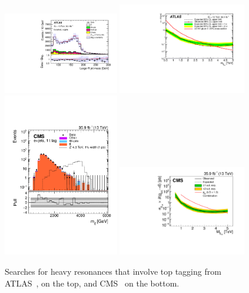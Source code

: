 \begin{figure}[t]
  \includegraphics[width=0.45\textwidth]{figures/ATLAS_top_largeRjetmass.pdf}
  \includegraphics[width=0.5\textwidth]{figures/ATLAS_masslimit_tt_Gkk.pdf} \\
  \includegraphics[width=0.45\textwidth]{figures/CMS_res_ttsemi.pdf}
  \includegraphics[width=0.5\textwidth]{figures/CMS_tt_gkk.pdf} 
  \caption{Searches for heavy resonances that involve top tagging from ATLAS~\cite{Aaboud:2018mjh}, on the top, and CMS~\cite{Sirunyan:2018ryr} on the bottom. }\label{fig:res_ttdecays}
\end{figure}

